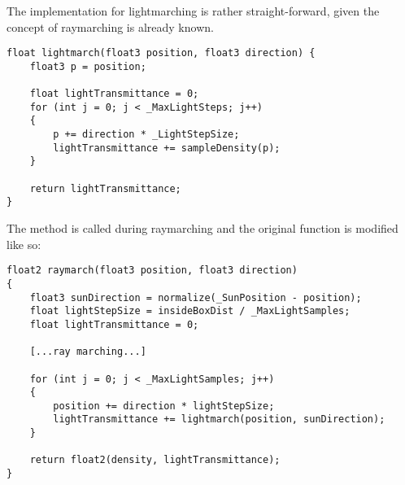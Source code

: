\begin{figure}[H]
    \label{img:tikz:prototypes:lightmarching2}
\end{figure}

\clearpage
\noindent
The implementation for \gls{lightmarching} is rather straight-forward, given the concept of \gls{raymarching} is already known.

\begin{lstlisting}[language=HLSL, caption=Implementation of lightmarching., label=lst:shader:prototype:lightmarching]
float lightmarch(float3 position, float3 direction) {
    float3 p = position;

    float lightTransmittance = 0;
    for (int j = 0; j < _MaxLightSteps; j++)
    {
        p += direction * _LightStepSize;
        lightTransmittance += sampleDensity(p);
    }

    return lightTransmittance;
}
\end{lstlisting}

\noindent
The method is called during \gls{raymarching} and the original function is modified like so:
\begin{lstlisting}[language=HLSL,caption=Implementation of raymarching with lightmarching., label=lst:shader:prototype:raylightmarching]
float2 raymarch(float3 position, float3 direction)
{
    float3 sunDirection = normalize(_SunPosition - position);
    float lightStepSize = insideBoxDist / _MaxLightSamples;
    float lightTransmittance = 0;

    [...ray marching...]
    
    for (int j = 0; j < _MaxLightSamples; j++)
    {
        position += direction * lightStepSize;
        lightTransmittance += lightmarch(position, sunDirection);
    }

    return float2(density, lightTransmittance);
}
\end{lstlisting}

